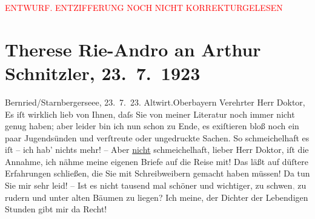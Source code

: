 
\begin{center}
            \textcolor{red}{ENTWURF. ENTZIFFERUNG NOCH NICHT KORREKTURGELESEN}
                      \end{center}
            
               \section[Therese Rie-Andro an Arthur Schnitzler, 23. 7. 1923]{ Therese Rie-Andro an Arthur Schnitzler, 23. 7. 1923}\nopagebreak{}\rehead{ }\begin{ledgroupsized}[t]{13cm}\normalsize\beginnumbering{} \toendnotes[C]{\smallbreak\pagebreak[2]} 
\toendnotes[C]{\smallbreak}\pstart
           \raggedleft{}{\pb}Bernried/Starnbergerseee,
                     23. 7. 23. \pend
           \pstart
           \raggedleft{}Altwirt.\hspace*{1.5em}Oberbayern\pend
           \pstart{}Verehrter Herr Doktor,\pend\pstart
           Es iſt wirklich lieb von Ihnen, daſs Sie von meiner Literatur noch immer nicht genug
               haben; aber leider bin ich nun schon zu Ende, es exiſtieren bloß noch ein paar
               Jugendsünden und verſtreute oder ungedruckte Sachen. So schmeichelhaft es iſt – ich
               hab’ nichts mehr! – Aber \uline{nicht} schmeichelhaft, lieber
               Herr Doktor, iſt die Annahme, ich nähme meine eigenen Briefe auf die Reise mit! Das
               läßt auf düſtere Erfahrungen schließen, die Sie mit Schreibweibern gemacht haben
               müssen! Da tun Sie mir sehr leid! – Ist es nicht tausend mal schöner und wichtiger,
               zu schw{\geminationm}en\textcolor{gray}{,} zu rudern und unter alten
               Bäumen zu liegen? Ich meine, der Dichter der Lebendigen
                  Stunden gibt mir da Recht!\pend

\end{ledgroupsized}
